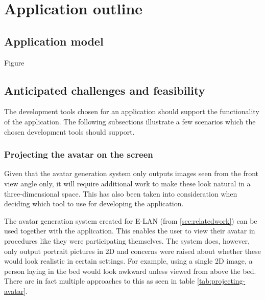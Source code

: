 \chapter{Application outline}
\label{ch:outline}

\section{Application model}

Figure

\section{Anticipated challenges and feasibility}

The development tools chosen for an application should support the functionality of the application. The following subsections illustrate a few scenarios which the chosen development tools should support.

\subsection{Projecting the avatar on the screen}

Given that the avatar generation system only outputs images seen from the front view angle only, it will require additional work to make these look natural in a three-dimensional space. This has also been taken into consideration when deciding which tool to use for developing the application.

The avatar generation system created for E-LAN (from \ref{sec:relatedwork}) can be used together with the application. This enables the user to view their avatar in procedures like they were participating themselves. The system does, however, only output portrait pictures in 2D and concerns were raised about whether these would look realistic in certain settings. For example, using a single 2D image, a person laying in the bed would look awkward unless viewed from above the bed. There are in fact multiple approaches to this as seen in table \ref{tab:projecting-avatar}.



